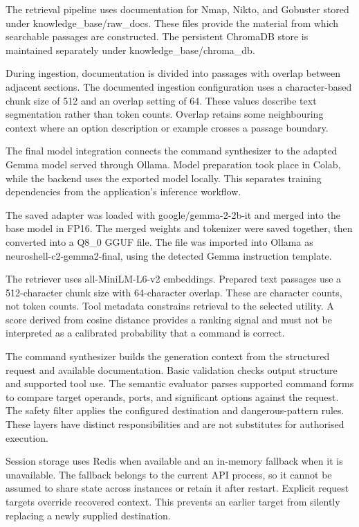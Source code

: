 \documentclass[
]{article}
\begin{document}
The retrieval pipeline uses documentation for Nmap, Nikto, and Gobuster
stored under knowledge\_base/raw\_docs. These files provide the material
from which searchable passages are constructed. The persistent ChromaDB
store is maintained separately under knowledge\_base/chroma\_db.

During ingestion, documentation is divided into passages with overlap
between adjacent sections. The documented ingestion configuration uses a
character-based chunk size of 512 and an overlap setting of 64. These
values describe text segmentation rather than token counts. Overlap
retains some neighbouring context where an option description or example
crosses a passage boundary.

The final model integration connects the command synthesizer to the
adapted Gemma model served through Ollama. Model preparation took place
in Colab, while the backend uses the exported model locally. This
separates training dependencies from the application's inference
workflow.

The saved adapter was loaded with google/gemma-2-2b-it and merged into
the base model in FP16. The merged weights and tokenizer were saved
together, then converted into a Q8\_0 GGUF file. The file was imported
into Ollama as neuroshell-c2-gemma2-final, using the detected Gemma
instruction template.

The retriever uses all-MiniLM-L6-v2 embeddings. Prepared text passages
use a 512-character chunk size with 64-character overlap. These are
character counts, not token counts. Tool metadata constrains retrieval
to the selected utility. A score derived from cosine distance provides a
ranking signal and must not be interpreted as a calibrated probability
that a command is correct.

The command synthesizer builds the generation context from the
structured request and available documentation. Basic validation checks
output structure and supported tool use. The semantic evaluator parses
supported command forms to compare target operands, ports, and
significant options against the request. The safety filter applies the
configured destination and dangerous-pattern rules. These layers have
distinct responsibilities and are not substitutes for authorised
execution.

Session storage uses Redis when available and an in-memory fallback when
it is unavailable. The fallback belongs to the current API process, so
it cannot be assumed to share state across instances or retain it after
restart. Explicit request targets override recovered context. This
prevents an earlier target from silently replacing a newly supplied
destination.
\end{document}

